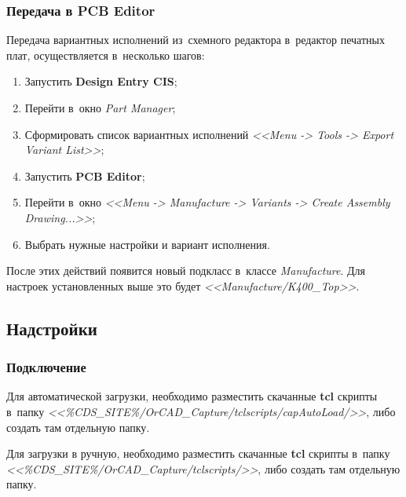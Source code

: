 \subsubsection{Передача в PCB Editor} \label{sssec:export_variant_list}

Передача вариантных исполнений из~схемного редактора в~редактор печатных плат, осуществляется в~несколько шагов:
\begin{enumerate}
	\item Запустить \textbf{Design Entry CIS};
	
	\item Перейти в~окно \textit{Part Manager};
	
	\item Сформировать список вариантных исполнений \textit{<<Menu -> Tools -> Export Variant List>>}; 
	
	\item Запустить \textbf{PCB Editor};
	
	\item Перейти в~окно \textit{<<Menu -> Manufacture -> Variants -> Create Assembly Drawing...>>};
	
	\item Выбрать нужные настройки и вариант исполнения.
	
		\begin{figure}[H]
		\end{figure}	
	
\end{enumerate}

После этих действий появится новый подкласс в~классе \textit{Manufacture}. Для настроек установленных выше это будет \textit{<<Manufacture/K400\_Top>>}.


\newpage
\subsection{Надстройки} \label{ssec:variant_list} \label{ssec:cis_plugin}



\subsubsection{Подключение} \label{sssec:cis_plugin_setup}

Для автоматической загрузки, необходимо разместить скачанные \textbf{tcl} скрипты в~папку \textit{<<\%CDS\_SITE\%/OrCAD\_Capture/tclscripts/capAutoLoad/>>}, либо создать там отдельную папку.

Для загрузки в ручную, необходимо разместить скачанные \textbf{tcl} скрипты в~папку \textit{<<\%CDS\_SITE\%/OrCAD\_Capture/tclscripts/>>}, либо создать там отдельную папку.


